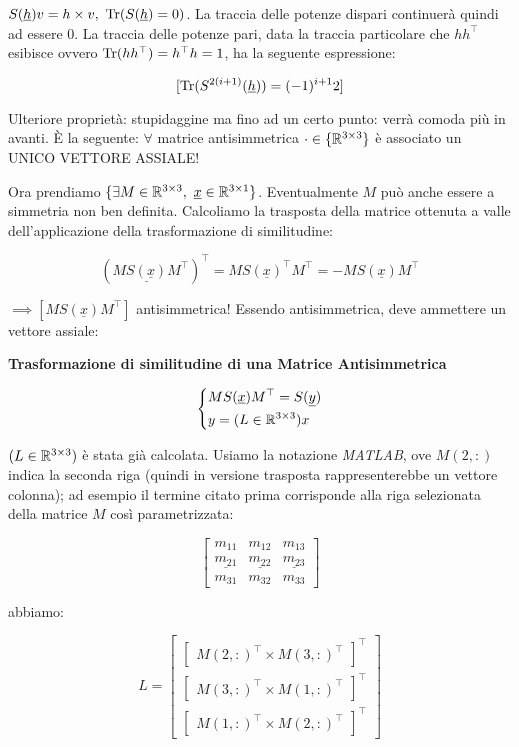 $S(\underline{h})v=h\times v,\ \Tr(S(\underline{h})=0)$. La traccia delle potenze dispari continuerà quindi ad essere 0. La traccia delle potenze pari, data la traccia particolare che $hh^\top$ esibisce ovvero $\operatorname{Tr}(hh^\top) = h^\top h=1$, ha la seguente espressione:

\[
	[\operatorname{Tr}(S^{2(i+1)}(\underline{h})) = (-1)^{i+1}2]
\]

Ulteriore proprietà: stupidaggine ma fino ad un certo punto: verrà comoda più in avanti. \`E la seguente: $\forall$ matrice antisimmetrica $\mathord{\cdot}\in\{\mathbb{R}^{3\times 3}\}$ è associato un UNICO VETTORE ASSIALE!

Ora prendiamo $\{\exists M\in\mathbb{R}^{3\times 3},\ \underline{x}\in\mathbb{R}^{3\times 1}\}$.
Eventualmente $M$ può anche essere a simmetria non ben definita. Calcoliamo la trasposta della matrice ottenuta a valle dell'applicazione della trasformazione di similitudine:

\[
	(M\underline{S(\underline{x})}M^\top)^\top = MS(\underline{x})^\top M^\top = -MS(\underline{x})M^\top
\]

$\implies [MS(\underline{x})M^\top]$ antisimmetrica! Essendo antisimmetrica, deve ammettere un vettore assiale: 

\begin{thrm}{\textbf{Trasformazione di similitudine di una Matrice Antisimmetrica}}

\[
	\left\{
	\begin{aligned}
	&MS(\underline{x})M^\top = S(\underline{y})\\
	&y = (L\in\mathbb{R}^{3\times 3})x
	\end{aligned}
	\right.
\]

\end{thrm}

$(L\in\mathbb{R}^{3\times 3})$ è stata già calcolata. Usiamo la notazione \emph{MATLAB}, ove $M(2,:)$ indica la seconda riga (quindi in versione trasposta rappresenterebbe un vettore colonna); ad esempio il termine citato prima corrisponde alla riga selezionata della matrice $M$ così parametrizzata:

\[
	\begin{bmatrix}m_{11}&m_{12}&m_{13}\\\underline{m_{21}}&\underline{m_{22}}&\underline{m_{23}}\\m_{31}&m_{32}&m_{33}\end{bmatrix}
\]

abbiamo:

\[
	L = \begin{bmatrix}\begin{bmatrix}M(2,:)^\top\times M(3,:)^\top\end{bmatrix}^\top\\\begin{bmatrix}M(3,:)^\top\times M(1,:)^\top\end{bmatrix}^\top\\\begin{bmatrix}M(1,:)^\top\times M(2,:)^\top\end{bmatrix}^\top\end{bmatrix}
\]


